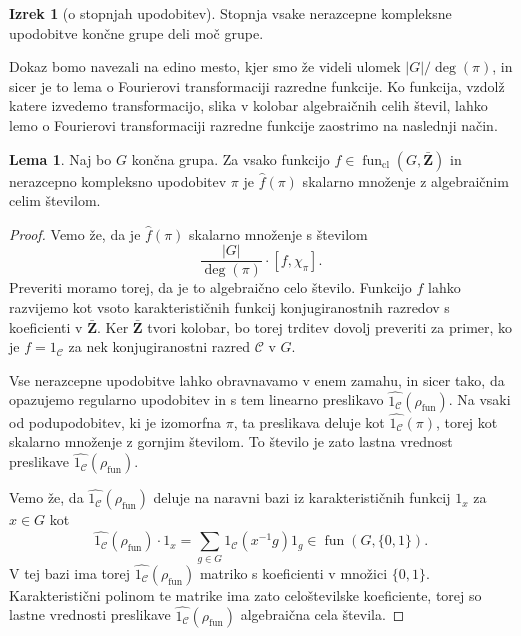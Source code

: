 \documentclass[11pt]{book}
\def\ZZ{\mathbf{Z}}
\def\conclass{\mathcal{C}}
\DeclareMathOperator\cl{cl}
\DeclareMathOperator\fun{fun}
\theoremstyle{definition}
\theoremstyle{zgled}
\theoremstyle{zgledbrezstevilke}
\theoremstyle{odprtproblem}
\theoremstyle{domacanaloga}
\newenvironment{dokaz}
    {\color{siva}\begin{proof}}
    {\end{proof}}
\theoremstyle{izrek}
\newtheorem{izrek}[theorem]{Izrek}
\newtheorem{lema}[theorem]{Lema}
\begin{document}
\begin{izrek}[o stopnjah upodobitev]
Stopnja vsake nerazcepne kompleksne upodobitve končne grupe deli moč grupe.
\end{izrek}

Dokaz bomo navezali na edino mesto, kjer smo že videli ulomek $|G|/\deg(\pi)$, in sicer je to lema o Fourierovi transformaciji razredne funkcije. Ko funkcija, vzdolž katere izvedemo transformacijo, slika v kolobar algebraičnih celih števil, lahko lemo o Fourierovi transformaciji razredne funkcije zaostrimo na naslednji način.

    \begin{lema}
    Naj bo $G$ končna grupa. Za vsako funkcijo $f \in \fun_{\cl}(G, \bar{\ZZ})$ in nerazcepno kompleksno upodobitev $\pi$ je $\hat{f}(\pi)$ skalarno množenje z algebraičnim celim številom.
    \end{lema}
    \begin{dokaz}
    Vemo že, da je $\hat{f}(\pi)$ skalarno množenje s številom
    \[
        \frac{|G|}{\deg(\pi)} \cdot [ f, \chi_{\pi} ].
    \]
    Preveriti moramo torej, da je to algebraično celo število. Funkcijo $f$ lahko razvijemo kot vsoto karakterističnih funkcij konjugiranostnih razredov s koeficienti v $\bar{\ZZ}$. Ker $\bar{\ZZ}$ tvori kolobar, bo torej trditev dovolj preveriti za primer, ko je $f = 1_{\conclass}$ za nek konjugiranostni razred $\conclass$ v $G$.
    
    Vse nerazcepne upodobitve lahko obravnavamo v enem zamahu, in sicer tako, da opazujemo regularno upodobitev in s tem linearno preslikavo $\widehat{1_{\conclass}}(\rho_{\fun})$. Na vsaki od podupodobitev, ki je izomorfna $\pi$, ta preslikava deluje kot $\widehat{1_{\conclass}}(\pi)$, torej kot skalarno množenje z gornjim številom. To število je zato lastna vrednost preslikave $\widehat{1_{\conclass}}(\rho_{\fun})$.
    
    Vemo že, da $\widehat{1_{\conclass}}(\rho_{\fun})$ deluje na naravni bazi iz karakterističnih funkcij $1_x$ za $x \in G$ kot
    \[
        \widehat{1_{\conclass}}(\rho_{\fun}) \cdot 1_x = \sum_{g \in G} 1_{\conclass}(x^{-1} g) 1_g \in \fun(G, \{ 0, 1 \}).
    \]
    V tej bazi ima torej $\widehat{1_{\conclass}}(\rho_{\fun})$ matriko s koeficienti v množici $\{ 0, 1 \}$. Karakteristični polinom te matrike ima zato celoštevilske koeficiente, torej so lastne vrednosti preslikave $\widehat{1_{\conclass}}(\rho_{\fun})$ algebraična cela števila.
    \end{dokaz}
    
\end{document}
